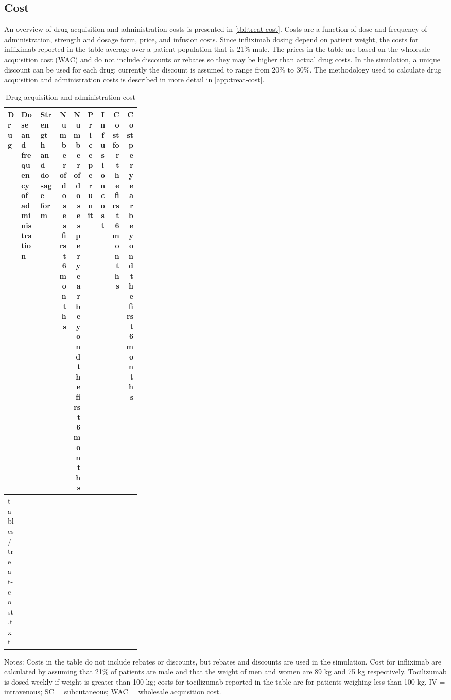 \documentclass[11pt,final,fleqn]{article}\usepackage[]{graphicx}\usepackage[]{color}
\makeatletter
\theoremstyle{plain}
\newcommand*\ExpandableInput[1]{\@@input#1 }
\makeatother
\begin{document}
\FloatBarrier

\subsection{Cost}\label{cost}


An overview of drug acquisition and administration costs is presented in \autoref{tbl:treat-cost}. Costs are a function of dose and frequency of administration, strength and dosage form, price, and infusion costs. Since infliximab dosing depend on patient weight, the costs for infliximab reported in the table average over a patient population that is 21\% male. The prices in the table are based on the wholesale acquisition cost (WAC) and do not include discounts or rebates so they may be higher than actual drug costs. In the simulation, a unique discount can be used for each drug; currently the discount is assumed to range from 20\% to 30\%. The methodology used to calculate drug acquisition and administration costs is described in more detail in \autoref{app:treat-cost}. 

\begin{table}
\begin{center}
\begin{threeparttable}
\caption{Drug acquisition and administration cost} \label{tbl:treat-cost}
\scriptsize
\begin{tabular}{lp{0.15\linewidth}p{0.15\linewidth}rrrrrr}
\hline
\multicolumn{1}{l}{Drug} &
\multicolumn{1}{p{0.15\linewidth}}{Dose and frequency of administration} & 
\multicolumn{1}{p{0.15\linewidth}}{Strength and dosage form} & 
\multicolumn{1}{p{0.08\linewidth}}{Number of doses first 6 months}  & 
\multicolumn{1}{p{0.08\linewidth}}{Number of doses per year beyond the first 6 months} & 
\multicolumn{1}{c}{Price per unit} & \multicolumn{1}{c}{Infusion cost} & 
\multicolumn{1}{p{0.08\linewidth}}{Cost for the first 6 months} &
\multicolumn{1}{p{0.08\linewidth}}{Cost per year beyond the first 6 months}\\
\hline
\ExpandableInput{tables/treat-cost.txt}
\hline
\end{tabular}
\tiny
Notes: Costs in the table do not include rebates or discounts, but rebates and discounts are used in the simulation. Cost for infliximab are calculated by assuming that 21\% of patients are male and that the weight of men and women are 89 kg and 75 kg respectively. Tocilizumab is dosed weekly if weight is greater than 100 kg; costs for tocilizumab reported in the table are for patients weighing less than 100 kg. IV = intravenous; SC = subcutaneous; WAC = wholesale acquisition cost. 
\end{threeparttable}
\end{center}
\end{table}
\end{document}
